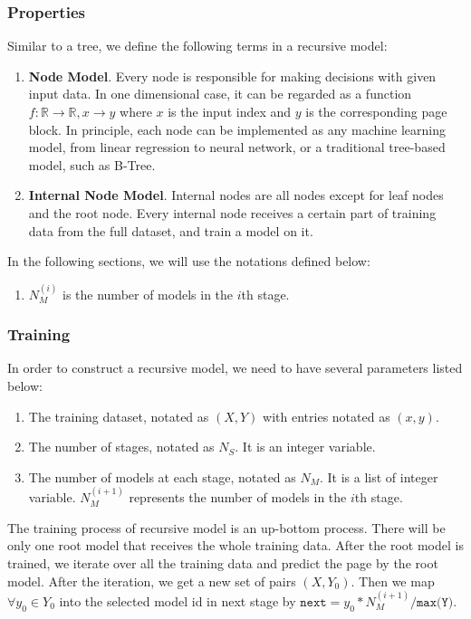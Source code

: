 \subsubsection{Properties}

Similar to a tree, we define the following terms in a recursive model:

\begin{enumerate}
	\item \textbf{Node Model}. Every node is responsible for making decisions with given input data. In one dimensional case, it can be regarded as a function $f:\mathbb{R}\to\mathbb{R}, x\to y$ where $x$ is the input index and $y$ is the corresponding page block. In principle, each node can be implemented as any machine learning model, from linear regression to neural network, or a traditional tree-based model, such as B-Tree.
	\item \textbf{Internal Node Model}. Internal nodes are all nodes except for leaf nodes and the root node. Every internal node receives a certain part of training data from the full dataset, and train a model on it. 
\end{enumerate}

In the following sections, we will use the notations defined below:
\begin{enumerate}
	\item $N_M^{(i)}$ is the number of models in the $i$th stage.
\end{enumerate}


\subsubsection{Training}

In order to construct a recursive model, we need to have several parameters listed below:
\begin{enumerate}
	\item The training dataset, notated as $(X, Y)$ with entries notated as $(x,y)$.
	\item The number of stages, notated as $N_S$. It is an integer variable.
	\item The number of models at each stage, notated as $N_M$. It is a list of integer variable. $N_M^{(i+1)}$ represents the number of models in the $i$th stage.
\end{enumerate}

The training process of recursive model is an up-bottom process. There will be only one root model that receives the whole training data. After the root model is trained, we iterate over all the training data and predict the page by the root model. After the iteration, we get a new set of pairs $(X, Y_0)$. Then we map $\forall y_0\in Y_0$ into the selected model id in next stage by $\texttt{next}=y_0 * N_M^{(i+1)}/\texttt{max(Y)}$.

